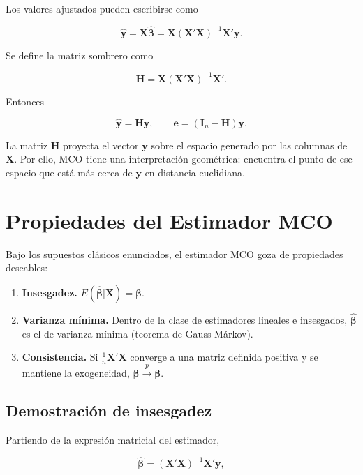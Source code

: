 \documentclass[11pt,a4paper]{article}
\begin{document}
Los valores ajustados pueden escribirse como

\[
\hat{\mathbf{y}}=\mathbf{X}\hat{\boldsymbol{\beta}}
=\mathbf{X}(\mathbf{X}'\mathbf{X})^{-1}\mathbf{X}'\mathbf{y}.
\]

Se define la matriz sombrero como

\[
\mathbf{H}=\mathbf{X}(\mathbf{X}'\mathbf{X})^{-1}\mathbf{X}'.
\]

Entonces

\[
\hat{\mathbf{y}}=\mathbf{H}\mathbf{y},
\qquad
\mathbf{e}=(\mathbf{I}_n-\mathbf{H})\mathbf{y}.
\]

La matriz \(\mathbf{H}\) proyecta el vector \(\mathbf{y}\) sobre el espacio generado por las columnas de \(\mathbf{X}\). Por ello, MCO tiene una interpretación geométrica: encuentra el punto de ese espacio que está más cerca de \(\mathbf{y}\) en distancia euclidiana.


\section{Propiedades del Estimador MCO}

Bajo los supuestos clásicos enunciados, el estimador MCO goza de propiedades deseables:

\begin{enumerate}[noitemsep]
    \item \textbf{Insesgadez.} \(E(\hat{\boldsymbol{\beta}}|\mathbf{X}) = \boldsymbol{\beta}\).
    \item \textbf{Varianza mínima.} Dentro de la clase de estimadores lineales e insesgados, \(\hat{\boldsymbol{\beta}}\) es el de varianza mínima (teorema de Gauss-Márkov).
    \item \textbf{Consistencia.} Si \( \frac{1}{n}\mathbf{X}'\mathbf{X} \) converge a una matriz definida positiva y se mantiene la exogeneidad, \(\hat{\boldsymbol{\beta}} \xrightarrow{p} \boldsymbol{\beta}\).
\end{enumerate}

\subsection*{Demostración de insesgadez}

Partiendo de la expresión matricial del estimador,

\[
\hat{\boldsymbol{\beta}}=(\mathbf{X}'\mathbf{X})^{-1}\mathbf{X}'\mathbf{y},
\]
\end{document}
